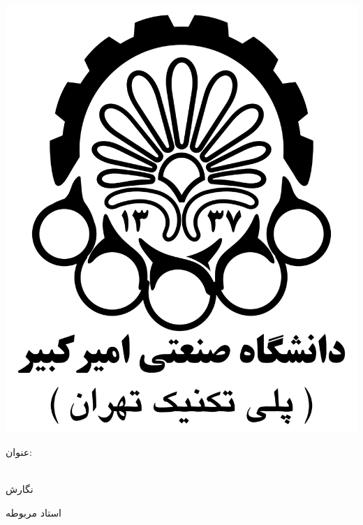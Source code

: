 
\begin{center}

\includegraphics[scale=0.15]{images/aut-fa.png}

\large\ThesisDepartment

\begin{large}
\vspace{0.5cm}



\end{large}

\vspace{1.5cm}

{عنوان:}\\[1.2em]
{\LARGE\textbf{\ThesisTitle}}\\ 
\vspace{1cm}

\vspace{2cm}

{نگارش}\\[.5em]
{\large\textbf{\ThesisAuthor}}

\vspace{1.5cm}

{استاد مربوطه}\\[.5em]
{\large\textbf{\ThesisSupervisor}}

\vspace{1cm}



\vspace{2cm}

\ThesisDate

\end{center}

\newpage

